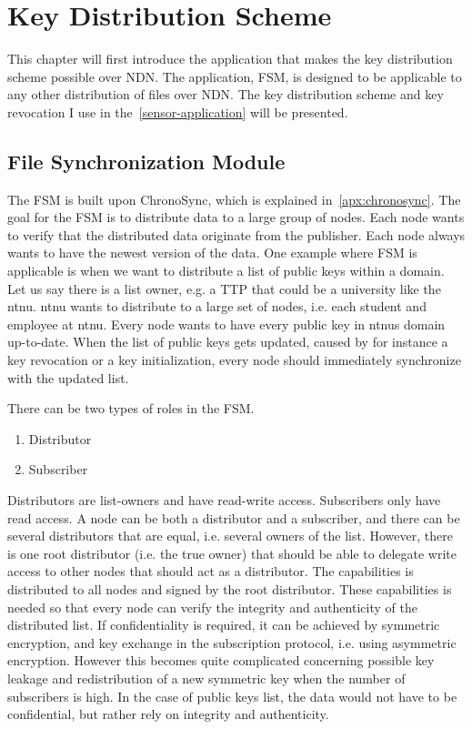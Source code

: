 \chapter{Key Distribution Scheme}\label{chp3:file-sync}
This chapter will first introduce the application that makes the key distribution scheme possible over \gls{NDN}.
The application, \gls{FSM}, is designed to be applicable to any other distribution of files over \gls{NDN}.
The key distribution scheme and key revocation I use in the~\autoref{sensor-application} will be presented.

\section{File Synchronization Module}\label{file-sync}
The \gls{FSM} is built upon ChronoSync, which is explained in~\autoref{apx:chronosync}.
The goal for the \gls{FSM} is to distribute \gls{data} to a large group of nodes.
Each node wants to verify that the distributed \gls{data} originate from the \gls{publisher}.
Each node always wants to have the newest version of the \gls{data}. 
One example where \gls{FSM} is applicable is when we want to distribute a list of public keys within a domain.
Let us say there is a list owner, e.g. a \gls{TTP} that could be a university like the \gls{ntnu}.
\gls{ntnu} wants to distribute to a large set of nodes, i.e. each student and employee at \gls{ntnu}.
Every node wants to have every public key in \gls{ntnu}s domain up-to-date.
When the list of public keys gets updated, caused by for instance a key revocation or a key initialization, every node should immediately synchronize with the updated list.

There can be two types of roles in the \gls{FSM}. 
\begin{enumerate}
	\item Distributor
	\item Subscriber
\end{enumerate}
Distributors are list-owners and have read-write access.
Subscribers only have read access.
A node can be both a distributor and a subscriber, and there can be several distributors that are equal, i.e. several owners of the list.
However, there is one root distributor (i.e. the true owner) that should be able to delegate write access to other nodes that should act as a distributor. 
The capabilities is distributed to all nodes and signed by the root distributor.
These capabilities is needed so that every node can verify the integrity and authenticity of the distributed list.
If confidentiality is required, it can be achieved by symmetric encryption, and key exchange in the subscription protocol, i.e. using asymmetric encryption.
However this becomes quite complicated concerning possible key leakage and redistribution of a new symmetric key when the number of subscribers is high. 
In the case of public keys list, the data would not have to be confidential, but rather rely on integrity and authenticity.

